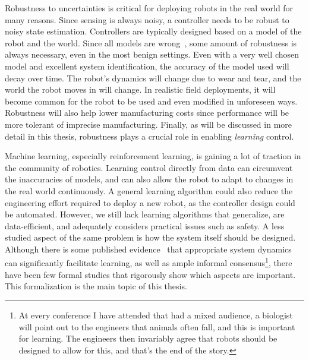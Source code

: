 Robustness to uncertainties is critical for deploying robots in the real world for many reasons.
Since sensing is always noisy, a controller needs to be robust to noisy state estimation.
Controllers are typically designed based on a model of the robot and the world. Since all models are wrong~\cite{box1976science}, some amount of robustness is always necessary, even in the most benign settings.
Even with a very well chosen model and excellent system identification, the accuracy of the model used will decay over time.
The robot's dynamics will change due to wear and tear, and the world the robot moves in will change.
In realistic field deployments, it will become common for the robot to be used and even modified in unforeseen ways.
Robustness will also help lower manufacturing costs since performance will be more tolerant of imprecise manufacturing.
Finally, as will be discussed in more detail in this thesis, robustness plays a crucial role in enabling \emph{learning} control.
\par
Machine learning, especially reinforcement learning, is gaining a lot of traction in the community of robotics. Learning control directly from data can circumvent the inaccuracies of models, and can also allow the robot to adapt to changes in the real world continuously.
A general learning algorithm could also reduce the engineering effort required to deploy a new robot, as the controller design could be automated.
However, we still lack learning algorithms that generalize, are data-efficient, and adequately considers practical issues such as safety.
A less studied aspect of the same problem is how the system itself should be designed. Although there is some published evidence~\cite{tedrake2005learning, randlov2000shaping} that appropriate system dynamics can significantly facilitate learning, as well as ample informal consensus\footnote{At every conference I have attended that had a mixed audience, a biologist will point out to the engineers that animals often fall, and this is important for learning. The engineers then invariably agree that robots should be designed to allow for this, and that's the end of the story.}, there have been few formal studies that rigorously show which aspects are important. This formalization is the main topic of this thesis.

